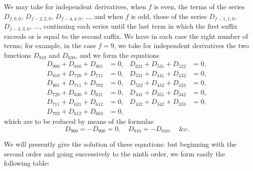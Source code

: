 \documentclass[11pt]{article}
\begin{document}
We may take for independent derivatives, when $f$ is even, the terms of the series $D_{f, 0, 0}$, $D_{f - 2, 2, 0}$, $D_{f - 4, 4, 0}$, \dots, and when $f$ is odd, those of the series $D_{f - 1, 1, 0}$, $D_{f - 3, 3, 0}$, $\dots$, continuing each series until the last term in which the first suffix exceeds or is equal to the second suffix. We have in each case the right number of terms; for example, in the case $f = 9$, we take for independent derivatives the two functions $D_{810}$ and $D_{630}$, and we form the equations
\begin{align*}
D_{900} + D_{810} + D_{801} &= 0, & D_{621} + D_{531} + D_{522} &= 0, \\
D_{810} + D_{720} + D_{711} &= 0, & D_{531} + D_{441} + D_{432} &= 0, \\
D_{801} + D_{711} + D_{702} &= 0, & D_{522} + D_{432} + D_{423} &= 0, \\
D_{720} + D_{630} + D_{621} &= 0, & D_{441} + D_{351} + D_{342} &= 0, \\
D_{711} + D_{621} + D_{612} &= 0, & D_{432} + D_{342} + D_{333} &= 0, \\
D_{702} + D_{612} + D_{603} &= 0, & &
\end{align*}
which are to be reduced by means of the formulas
\[
D_{900} = -D_{900} = 0,\quad D_{810} = -D_{810},\quad \&c.
\]

We will presently give the solution of these equations: but beginning with the second order and going successively to the ninth order, we form easily the following table:

\medskip
\end{document}
